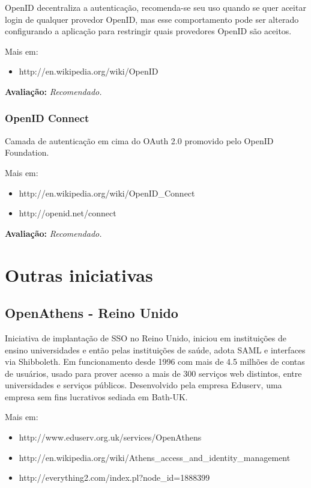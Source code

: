 \documentclass[11pt]{article}
\begin{document}
OpenID decentraliza a autenticação, recomenda-se seu uso quando se quer
aceitar login de qualquer provedor OpenID, mas esse comportamento pode ser
alterado configurando a aplicação para restringir quais provedores OpenID são
aceitos.

Mais em:
\begin{itemize}
  \item{http://en.wikipedia.org/wiki/OpenID}
\end{itemize}

{\bf Avaliação:} {\it Recomendado.}

\subsubsection{OpenID Connect}

Camada de autenticação em cima do OAuth 2.0 promovido pelo OpenID Foundation.

Mais em:
\begin{itemize}
  \item{http://en.wikipedia.org/wiki/OpenID\_Connect}
  \item{http://openid.net/connect}
\end{itemize}

{\bf Avaliação:} {\it Recomendado.}

\section{Outras iniciativas}

\subsection{OpenAthens - Reino Unido}

Iniciativa de implantação de SSO no Reino Unido, iniciou em instituições de
ensino universidades e então pelas instituições de saúde, adota SAML e
interfaces via Shibboleth. Em funcionamento desde 1996 com mais de 4.5 milhões
de contas de usuários, usado para prover acesso a mais de 300 serviços web
distintos, entre universidades e serviços públicos. Desenvolvido pela empresa
Eduserv, uma empresa sem fins lucrativos sediada em Bath-UK.

Mais em:
\begin{itemize}
  \item{http://www.eduserv.org.uk/services/OpenAthens}
  \item{http://en.wikipedia.org/wiki/Athens\_access\_and\_identity\_management}
  \item{http://everything2.com/index.pl?node\_id=1888399}
\end{itemize}
\end{document}
